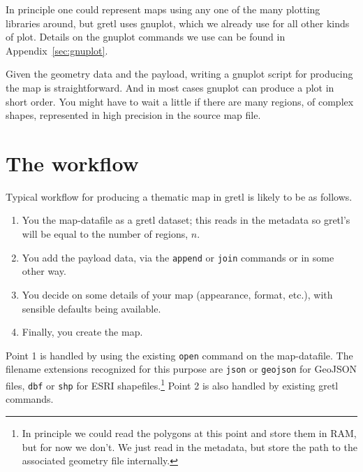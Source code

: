 \documentclass{article}
\begin{document}
In principle one could represent maps using any one of the many
plotting libraries around, but gretl uses \textsf{gnuplot}, which we
already use for all other kinds of plot. Details on the
\textsf{gnuplot} commands we use can be found in
Appendix~\ref{sec:gnuplot}.

Given the geometry data and the payload, writing a \textsf{gnuplot}
script for producing the map is straightforward. And in most cases
\textsf{gnuplot} can produce a plot in short order. You might have to
wait a little if there are many regions, of complex shapes,
represented in high precision in the source map file.

\section{The workflow}
\label{sec:workflow}

Typical workflow for producing a thematic map in gretl is likely to be
as follows.

\begin{enumerate}
\item You  the map-datafile as a gretl dataset; this reads
  in the metadata so gretl's  will be equal to the number
  of regions, $n$.
\item You add the payload data, via the \texttt{append} or
  \texttt{join} commands or in some other way.
\item You decide on some details of your map (appearance, format,
  etc.), with sensible defaults being available.
\item Finally, you create the map.
\end{enumerate}

Point 1 is handled by using the existing \texttt{open} command on the
map-datafile. The filename extensions recognized for this purpose are
\texttt{json} or \texttt{geojson} for GeoJSON files, \texttt{dbf} or
\texttt{shp} for ESRI shapefiles.\footnote{In principle we could read
  the polygons at this point and store them in RAM, but for now we
  don't. We just read in the metadata, but store the path to the
  associated geometry file internally.} Point 2 is also handled by
existing gretl commands.
\end{document}
